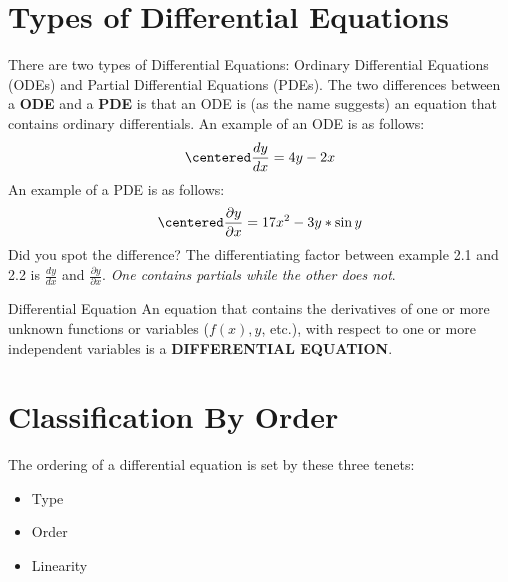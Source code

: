 \documentclass[letter, 11pt]{book}
\begin{document}
\section{Types of Differential Equations}
There are two types of Differential Equations: Ordinary Differential Equations (ODEs) and Partial Differential Equations (PDEs).
The two differences between a \textbf{ODE} and a \textbf{PDE} is that an ODE is (as the name suggests) an equation that contains ordinary differentials. An example of an ODE is as follows:
\begin{equation}\label{Ex. 1}
\centered
\frac{dy}{dx} = 4y - 2x
\end{equation}
An example of a PDE is as follows:
\begin{equation}\label{Ex. 2}
\centered
\frac{\partial y}{\partial x} = 17x^2 -3y*\sin{y}
\end{equation}
Did you spot the difference? The differentiating factor between example 2.1 and 2.2 is $\frac{dy}{dx}$ and $\frac{\partial y}{\partial x}$. \textit{One contains partials while the other does not}.
\begin{definition}{Differential Equation}{}
	An equation that contains the derivatives of one or more unknown functions or variables ($f(x), y$, etc.), with respect to one or more independent variables is a \textbf{DIFFERENTIAL EQUATION}.
\end{definition}

\section{Classification By Order}
	The ordering of a differential equation is set by these three tenets:
\begin{itemize}
	\item Type
	\item Order
	\item Linearity
\end{itemize}
\end{document}
